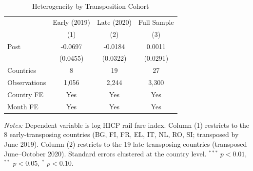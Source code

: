 \begin{table}[htbp]
\centering
\caption{Heterogeneity by Transposition Cohort}
\label{tab:heterogeneity}
\begin{tabular}{lccc}
\hline\hline
 & Early (2019) & Late (2020) & Full Sample \\
 & (1) & (2) & (3) \\
\hline
Post & -0.0697 & -0.0184 & 0.0011 \\
  & (0.0455) & (0.0322) & (0.0291) \\
\hline
Countries & 8 & 19 & 27 \\
Observations & 1,056 & 2,244 & 3,300 \\
Country FE & Yes & Yes & Yes \\
Month FE & Yes & Yes & Yes \\
\hline\hline
\end{tabular}
\begin{tablenotes}[flushleft]\footnotesize
\item \textit{Notes:} Dependent variable is log HICP rail fare index. Column (1) restricts to the 8 early-transposing countries (BG, FI, FR, EL, IT, NL, RO, SI; transposed by June 2019). Column (2) restricts to the 19 late-transposing countries (transposed June--October 2020). Standard errors clustered at the country level. $^{***}$ $p<0.01$, $^{**}$ $p<0.05$, $^{*}$ $p<0.10$.
\end{tablenotes}
\end{table}
